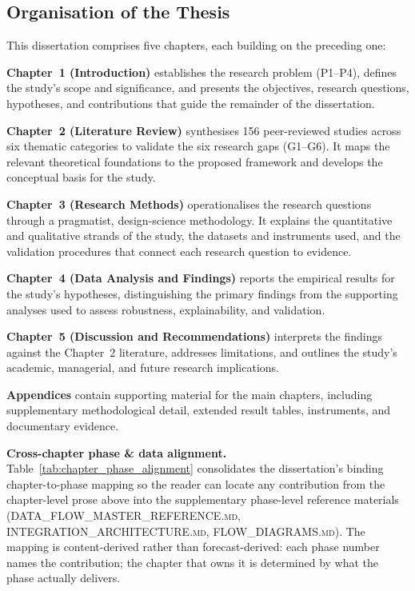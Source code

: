\subsection{Organisation of the Thesis}
\label{sec:thesis_organisation}

This dissertation comprises five chapters, each building on the preceding one:

\textbf{Chapter~1 (Introduction)} establishes the research problem (P1--P4), defines the study's scope and significance, and presents the objectives, research questions, hypotheses, and contributions that guide the remainder of the dissertation.

\textbf{Chapter~2 (Literature Review)} synthesises 156 peer-reviewed studies across six thematic categories to validate the six research gaps (G1--G6). It maps the relevant theoretical foundations to the proposed framework and develops the conceptual basis for the study.

\textbf{Chapter~3 (Research Methods)} operationalises the research questions through a pragmatist, design-science methodology. It explains the quantitative and qualitative strands of the study, the datasets and instruments used, and the validation procedures that connect each research question to evidence.

\textbf{Chapter~4 (Data Analysis and Findings)} reports the empirical results for the study's hypotheses, distinguishing the primary findings from the supporting analyses used to assess robustness, explainability, and validation.

\textbf{Chapter~5 (Discussion and Recommendations)} interprets the findings against the Chapter~2 literature, addresses limitations, and outlines the study's academic, managerial, and future research implications.

\textbf{Appendices} contain supporting material for the main chapters, including supplementary methodological detail, extended result tables, instruments, and documentary evidence.

\noindent\textbf{Cross-chapter phase \& data alignment.} Table~\ref{tab:chapter_phase_alignment} consolidates the dissertation's binding chapter-to-phase mapping so the reader can locate any contribution from the chapter-level prose above into the supplementary phase-level reference materials (\textsc{DATA\_FLOW\_MASTER\_REFERENCE.md}, \textsc{INTEGRATION\_ARCHITECTURE.md}, \textsc{FLOW\_DIAGRAMS.md}). The mapping is content-derived rather than forecast-derived: each phase number names the contribution; the chapter that owns it is determined by what the phase actually delivers.

